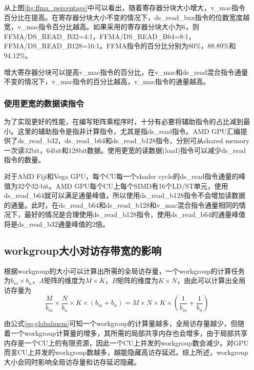从上图\ref{fig:ffma_percentage}中可以看出，随着寄存器分块大小增大，v\_mac指令百分比在提高。在寄存器分块大小不变的情况下，ds\_read\_bxx指令的位数宽度越宽，v\_mac指令百分比越高。如果采用的寄存器分块大小为6，则FFMA/DS\_READ\_B32=4:1，FFMA/DS\_READ\_B64=8:1，FFMA/DS\_READ\_B128=16:1。FFMA指令的百分比分别为80\%，88.89\%和94.12\%。

增大寄存器分块可以提高v\_mac指令的百分比，在v\_mac和ds\_read混合指令通量不变的情况下，v\_mac指令的百分比越高，v\_mac指令的通量越高。

\subsubsection{使用更宽的数据读指令}
为了实现更好的性能，在编写矩阵乘程序时，十分有必要将辅助指令的占比减到最小。这里的辅助指令是指非计算指令，尤其是指ds\_read指令。AMD GPU汇编提供了ds\_read\_b32，ds\_read\_b64和ds\_read\_b128指令，分别可从shared memory一次读32bit，64bit和128bit数据。使用更宽的读数据(load)指令可以减少ds\_read指令的数量。

对于AMD Fiji和Vega GPU，每个CU每一个shader cycle的ds\_read指令通量的峰值为32个32-bit。AMD GPU每个CU上每个SIMD有16个LD/ST单元，使用ds\_read\_b64就可以满足通量峰值，所以使用ds\_read\_b128指令不会增加读数据的通量。此时，在ds\_read\_b64和ds\_read\_b128和v\_mac混合指令通量相同的情况下，最好的情况是合理使用ds\_read\_b128指令，使用ds\_read\_b64的通量峰值将是ds\_read\_b32通量峰值的2倍。


\subsection{workgroup大小对访存带宽的影响}
根据workgroup的大小可以计算出所需的全局访存量，一个workgroup的计算任务为$b_m \times b_n$，$A$矩阵的维度为$M \times K$，$B$矩阵的维度为$K \times N$，由此可以计算出全局访存量为
\begin{equation}
\label{eq:globalmem}
\frac{M}{b_m} \times \frac{N}{b_n} \times K \times (b_m + b_n) = M \times N \times K \times (\frac{1}{b_m} + \frac{1}{b_n})
\end{equation}

由公式\ref{eq:globalmem}可知一个workgroup的计算量越多，全局访存量越少，但随着一个workgroup计算量的增多，其所需的局部共享内存也会增多，由于局部共享内存是一个CU上的有限资源，因此一个CU上并发的workgroup数会减少。对GPU而言CU上并发的workgroup数越多，越能隐藏高访存延迟。综上所述，workgroup大小会同时影响全局访存量和访存延迟隐藏。

